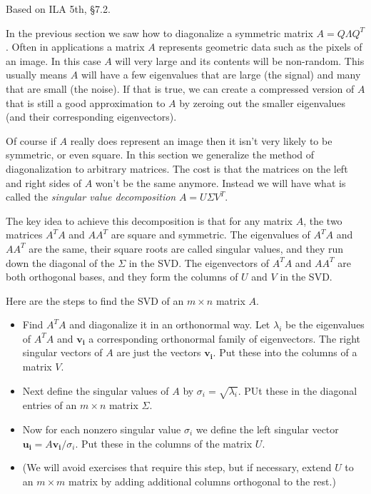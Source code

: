 \documentclass[11pt,oneside]{amsbook}
\theoremstyle{definition}
\theoremstyle{plain}
\theoremstyle{definition}
\theoremstyle{remark}
\numberwithin{equation}{section}
\numberwithin{figure}{section}
\begin{document}
Based on ILA 5th, \S 7.2.

In the previous section we saw how to diagonalize a symmetric matrix $A=Q\Lambda Q^T$. Often in applications a matrix $A$ represents geometric data such as the pixels of an image. In this case $A$ will very large and its contents will be non-random. This usually means $A$ will have a few eigenvalues that are large (the signal) and many that are small (the noise). If that is true, we can create a compressed version of $A$ that is still a good approximation to $A$ by zeroing out the smaller eigenvalues (and their corresponding eigenvectors).

Of course if $A$ really does represent an image then it isn't very likely to be symmetric, or even square. In this section we generalize the method of diagonalization to arbitrary matrices. The cost is that the matrices on the left and right sides of $A$ won't be the same anymore. Instead we will have what is called the \emph{singular value decomposition} $A=U\Sigma V^T$.

The key idea to achieve this decomposition is that for any matrix $A$, the two matrices $A^TA$ and $AA^T$ are square and symmetric. The eigenvalues of $A^TA$ and $AA^T$ are the same, their square roots are called singular values, and they run down the diagonal of the $\Sigma$ in the SVD. The eigenvectors of $A^TA$ and $AA^T$ are both orthogonal bases, and they form the columns of $U$ and $V$ in the SVD.

Here are the steps to find the SVD of an $m\times n$ matrix $A$.

\begin{itemize}
  \item Find $A^TA$ and diagonalize it in an orthonormal way. Let $\lambda_i$ be the eigenvalues of $A^TA$ and $\mathbf{v_i}$ a corresponding orthonormal family of eigenvectors. The right singular vectors of $A$ are just the vectors $\mathbf{v_i}$. Put these into the columns of a matrix $V$.
  \item Next define the singular values of $A$ by $\sigma_i=\sqrt{\lambda_i}$. PUt these in the diagonal entries of an $m\times n$ matrix $\Sigma$.
  \item Now for each nonzero singular value $\sigma_i$ we define the left singular vector $\mathbf{u_i}=A\mathbf{v_i}/\sigma_i$. Put these in the columns of the matrix $U$.
  \item (We will avoid exercises that require this step, but if necessary, extend $U$ to an $m\times m$ matrix by adding additional columns orthogonal to the rest.)
\end{itemize}
\end{document}
